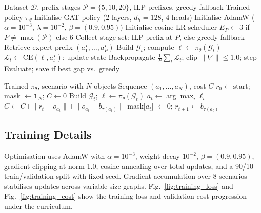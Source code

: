 \documentclass[conference]{IEEEtran}
\begin{document}
\begin{algorithm}[htbp]
\caption{Curriculum-Based Imitation Learning}
\label{alg:training}
\begin{algorithmic}[1]
\REQUIRE Dataset $\mathcal{D}$, prefix stages $\mathcal{P}{=}\{5,10,20\}$, ILP prefixes, greedy fallback
\ENSURE Trained policy $\pi_\theta$
\STATE Initialise GAT policy (2 layers, $d_h{=}128$, 4 heads)
\STATE Initialise AdamW ($\alpha{=}10^{-3}$, $\lambda{=}10^{-2}$, $\beta{=}(0.9, 0.95)$)
\STATE Initialise cosine LR scheduler
    \STATE $E_P \leftarrow 3$ if $P \neq \max(\mathcal{P})$ else $6$
    \STATE Collect stage set: ILP prefix at $P$, else greedy fallback
            \STATE Retrieve expert prefix $(a_1^\star, \dots, a_P^\star)$
                \STATE Build $\mathcal{G}_t$; compute $\ell \leftarrow \pi_\theta(\mathcal{G}_t)$
                \STATE $\mathcal{L}_t \leftarrow \text{CE}(\ell, a_t^\star)$; update state
            \ENDFOR
            \STATE Backpropagate $\frac{1}{P}\sum_t \mathcal{L}_t$; clip $\|\nabla\|{\le}1.0$; step
        \ENDFOR
        \STATE Evaluate; save if best gap vs.\ greedy
    \ENDFOR
\ENDFOR
\end{algorithmic}
\end{algorithm}

\begin{algorithm}[htbp]
\caption{Greedy Inference Rollout}
\label{alg:inference}
\begin{algorithmic}[1]
\REQUIRE Trained $\pi_\theta$, scenario with $N$ objects
\ENSURE Sequence $(a_1, \dots, a_N)$, cost $C$
\STATE $r_0 \leftarrow \text{start}$; mask $\leftarrow \mathbf{1}_N$; $C \leftarrow 0$
    \STATE Build $\mathcal{G}_t$; $\ell \leftarrow \pi_\theta(\mathcal{G}_t)$
    \STATE $a_t \leftarrow \arg\max_i \ell_i$
    \STATE $C \leftarrow C + \|r_t - o_{a_t}\| + \|o_{a_t} - b_{\tau(a_t)}\|$
    \STATE mask[$a_t$] $\leftarrow 0$; $r_{t+1} \leftarrow b_{\tau(a_t)}$
\ENDFOR
\end{algorithmic}
\end{algorithm}

\subsection{Training Details}

Optimisation uses AdamW \cite{loshchilov2019adamw} with $\alpha{=}10^{-3}$, weight decay $10^{-2}$, $\beta{=}(0.9, 0.95)$, gradient clipping at norm 1.0, cosine annealing over total updates, and a 90/10 train/validation split with fixed seed. Gradient accumulation over 8 scenarios stabilises updates across variable-size graphs. Fig.~\ref{fig:training_loss} and Fig.~\ref{fig:training_cost} show the training loss and validation cost progression under the curriculum.
\end{document}
